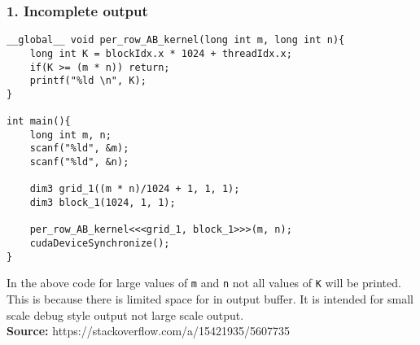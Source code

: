 \begin{multicols*}{3}
\subsubsection*{1. Incomplete output}

\begin{verbatim}
__global__ void per_row_AB_kernel(long int m, long int n){
    long int K = blockIdx.x * 1024 + threadIdx.x;
    if(K >= (m * n)) return;
    printf("%ld \n", K);	
}

int main(){
    long int m, n;
    scanf("%ld", &m);
    scanf("%ld", &n);
    
    dim3 grid_1((m * n)/1024 + 1, 1, 1);
    dim3 block_1(1024, 1, 1);
    
    per_row_AB_kernel<<<grid_1, block_1>>>(m, n);
    cudaDeviceSynchronize();                                                           
}	
\end{verbatim}

In the above code for large values of \texttt{m} and \texttt{n} not all values of \texttt{K} will be printed. This is because there is limited space for in output buffer. It is intended for small scale debug style output not large scale output.\\
\textbf{Source:} https://stackoverflow.com/a/15421935/5607735
\end{multicols*}
